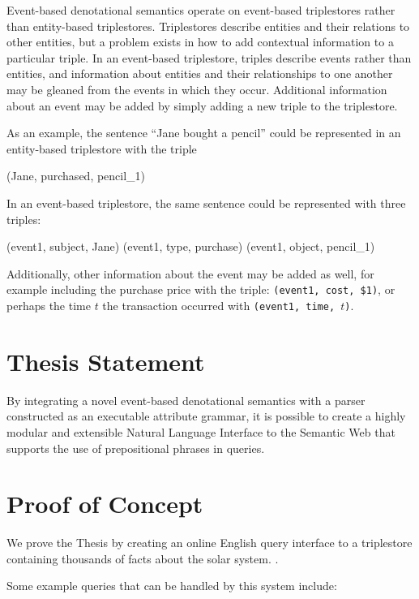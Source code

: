 \documentclass[../main.tex]{subfiles}
\begin{document}
Event-based denotational semantics operate on event-based triplestores\cite{frost2014demonstration} rather than entity-based triplestores.  Triplestores describe entities and their relations to other entities, but a problem exists in how to add contextual information to a particular triple.  In an event-based triplestore, triples describe events rather than entities, and information about entities and their relationships to one another may be gleaned from the events in which they occur.  Additional information about an event may be added by simply adding a new triple to the triplestore.

As an example, the sentence ``Jane bought a pencil'' could be represented in an entity-based triplestore with the triple


\begin{code}
	(Jane, purchased, pencil_1)
\end{code}

In an event-based triplestore, the same sentence could be represented with three triples:

\begin{code}
	(event1, subject, Jane)
	(event1, type, purchase)
	(event1, object, pencil_1)
\end{code}
	
Additionally, other information about the event may be added as well, for example including the purchase price with the triple: \texttt{(event1, cost, \$1)}, or perhaps the time $t$ the transaction occurred with \texttt{(event1, time, $t$)}.  

\section{Thesis Statement}
By integrating a novel event-based denotational semantics with a parser constructed as an executable attribute grammar, it is possible to create a highly modular and extensible Natural Language Interface to the Semantic Web that supports the use of prepositional phrases in queries.

\section{Proof of Concept} We prove the Thesis by creating an online English query interface to a triplestore containing thousands of facts about the solar system. \cite{Solarman:2016}.

Some example queries that can be handled by this system include:
\end{document}
